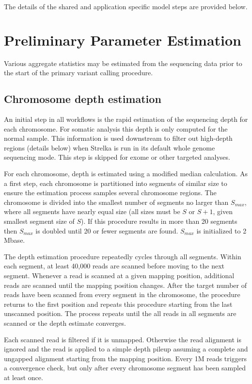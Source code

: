 \documentclass{article}
\begin{document}
The details of the shared and application specific model steps are provided below.



\section{Preliminary Parameter Estimation}

Various aggregate statistics may be estimated from the sequencing data prior to the start of the primary variant calling procedure.

\subsection{Chromosome depth estimation}
\label{sec:depth_est}

An initial step in all workflows is the rapid estimation of the sequencing depth for each chromosome. For somatic analysis this depth is only computed for the normal sample. This information is used downstream to filter out high-depth regions (details below) when Strelka is run in its default whole genome sequencing mode. This step is skipped for exome or other targeted analyses.

For each chromosome, depth is estimated using a modified median calculation. As a first step, each chromosome is partitioned into segments of similar size to ensure the estimation process samples several chromosome regions. The chromosome is divided into the smallest number of segments no larger than $S_{max}$, where all segments have nearly equal size (all sizes must be $S$ or $S+1$, given smallest segment size of $S$). If this procedure results in more than 20 segments then $S_{max}$ is doubled until 20 or fewer segments are found. $S_{max}$ is initialized to 2 Mbase.

The depth estimation procedure repeatedly cycles through all segments. Within each segment, at least 40,000 reads are scanned before moving to the next segment. Whenever a read is scanned at a given mapping position, additional reads are scanned until the mapping position changes. After the target number of reads have been scanned from every segment in the chromosome, the procedure returns to the first position and repeats this procedure starting from the last unscanned position. The process repeats until the all reads in all segments are scanned or the depth estimate converges.

Each scanned read is filtered if it is unmapped. Otherwise the read alignment is ignored and the read is applied to a simple depth pileup assuming a complete and ungapped alignment starting from the mapping position. Every 1M reads triggers a convergence check, but only after every chromosome segment has been sampled at least once.
\end{document}
